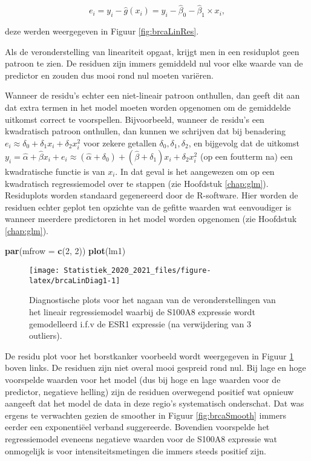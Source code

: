 \documentclass[
  12pt,dutch,coursenotes]{book}
\newenvironment{Shaded}{\begin{snugshade}}{\end{snugshade}}
\newcommand{\DataTypeTok}[1]{\textcolor[rgb]{0.13,0.29,0.53}{#1}}
\newcommand{\DecValTok}[1]{\textcolor[rgb]{0.00,0.00,0.81}{#1}}
\newcommand{\KeywordTok}[1]{\textcolor[rgb]{0.13,0.29,0.53}{\textbf{#1}}}
\newcommand{\NormalTok}[1]{#1}
\theoremstyle{definition}
\theoremstyle{definition}
\theoremstyle{definition}
\theoremstyle{remark}
\begin{document}
\[e_i=y_i-\hat{g}(x_i)=y_i-\hat\beta_0-\hat\beta_1\times x_i,\]

deze werden weergegeven in Figuur \ref{fig:brcaLinRes}.

Als de veronderstelling van lineariteit opgaat, krijgt men in een residuplot geen patroon te zien.
De residuen zijn immers gemiddeld nul voor elke waarde van de predictor en zouden dus mooi rond nul moeten variëren.

Wanneer de residu's echter een niet-lineair patroon onthullen, dan geeft dit aan dat extra termen in het model moeten worden opgenomen om de
gemiddelde uitkomst correct te voorspellen. Bijvoorbeeld, wanneer de residu's een kwadratisch patroon onthullen, dan kunnen we schrijven dat bij benadering \(e_i\approx \delta_0+\delta_1 x_i+\delta_2 x_i^2\) voor zekere getallen \(\delta_0,\delta_1,\delta_2\), en bijgevolg
dat de uitkomst \(y_i=\hat{\alpha}+\hat{\beta}x_i+e_i\approx (\hat{\alpha}+\delta_0)+(\hat{\beta}+\delta_1)x_i+\delta_2 x_i^2\) (op een foutterm na) een kwadratische functie is van \(x_i\). In dat geval is het aangewezen om op een kwadratisch regressiemodel over te stappen (zie Hoofdstuk \ref{chap:glm}).
Residuplots worden standaard gegenereerd door de R-software. Hier worden de residuen echter geplot ten opzichte van de gefitte waarden wat eenvoudiger is wanneer meerdere predictoren in het model worden opgenomen (zie Hoofdstuk \ref{chap:glm}).

\begin{Shaded}
\begin{Highlighting}[]
\KeywordTok{par}\NormalTok{(}\DataTypeTok{mfrow =} \KeywordTok{c}\NormalTok{(}\DecValTok{2}\NormalTok{, }\DecValTok{2}\NormalTok{))}
\KeywordTok{plot}\NormalTok{(lm1)}
\end{Highlighting}
\end{Shaded}

\begin{figure}

{\centering \texttt{[image: Statistiek\_2020\_2021\_files/figure-latex/brcaLinDiag1-1]} 

}

\caption{Diagnostische plots voor het nagaan van de veronderstellingen van het lineair regressiemodel waarbij de S100A8 expressie wordt gemodelleerd i.f.v de ESR1 expressie (na verwijdering van 3 outliers).}\label{fig:brcaLinDiag1}
\end{figure}

De residu plot voor het borstkanker voorbeeld wordt weergegeven in Figuur \ref{fig:brcaLinDiag1} boven links.
De residuen zijn niet overal mooi gespreid rond nul.
Bij lage en hoge voorspelde waarden voor het model (dus bij hoge en lage waarden voor de predictor, negatieve helling) zijn de residuen overwegend positief wat opnieuw aangeeft dat het model de data in deze regio's systematisch onderschat.
Dat was ergens te verwachten gezien de smoother in Figuur \ref{fig:brcaSmooth} immers eerder een exponentiëel verband suggereerde.
Bovendien voorspelde het regressiemodel eveneens negatieve waarden voor de S100A8 expressie wat onmogelijk is voor intensiteitsmetingen die immers steeds positief zijn.
\end{document}
